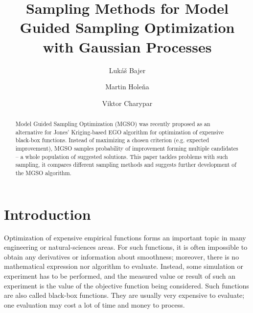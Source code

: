 \documentclass{itatnew}
\begin{document}
\title{Sampling Methods for Model Guided Sampling Optimization
  with Gaussian Processes}

\author{Lukáš Bajer \and Martin Holeňa \and Viktor Charypar }


\maketitle              %

\begin{abstract}
Model Guided Sampling Optimization (MGSO) was recently proposed as an alternative for Jones' Kriging-based EGO algorithm for optimization of expensive black-box functions. Instead of maximizing a chosen criterion (e.g. expected improvement), MGSO samples probability of improvement forming multiple candidates -- a whole population of suggested solutions. This paper tackles problems with such sampling, it compares different sampling methods and suggests further development of the MGSO algorithm.
\end{abstract}

\section{Introduction}
%
Optimization of expensive empirical functions forms an important topic in many engineering or natural-sciences areas. For such functions, it is often impossible to obtain any derivatives or information about smoothness; moreover, there is no mathematical expression nor algorithm to evaluate. Instead, some simulation or experiment has to be performed, and the measured value or result of such an experiment is the value of the objective function being considered. Such functions are also called black-box functions. 
They are usually very expensive to evaluate; one evaluation may cost a lot of time and money to process.
\end{document}
